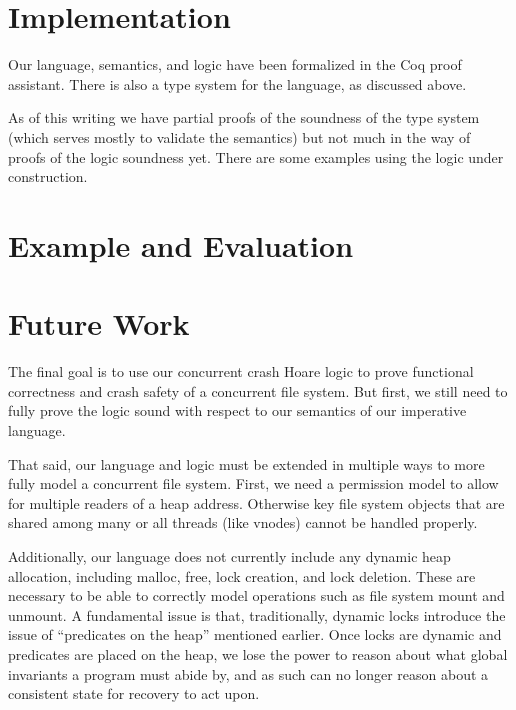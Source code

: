 \section{Implementation}
\label{sec:imp}

Our language, semantics, and logic have been formalized in the Coq
proof assistant.
There is also a type system for the language, as discussed above.

As of this writing we have partial proofs of the soundness of the type
system (which serves mostly to validate the semantics) but not much in
the way of proofs of the logic soundness yet.
There are some examples using the logic under construction.


\section{Example and Evaluation}
\label{sec:eval}



\section{Future Work}
\label{sec:future}


The final goal is to use our concurrent crash Hoare logic to prove
functional correctness and crash safety
of a concurrent file system.
But first,
we still need to fully prove the logic sound with respect to our
semantics of our imperative language.

That said, our language and logic must be extended in multiple ways to more
fully model a concurrent file system.
First, we need a
permission model to allow for multiple readers of a heap address.
Otherwise key file system objects that are shared among many or all
threads (like vnodes) cannot be handled properly.

Additionally, our language does not currently include any dynamic heap
allocation, including malloc, free, lock creation, and lock deletion.
These are
necessary to be able to correctly model operations such as file system mount and
unmount.
A fundamental issue is that, traditionally, dynamic locks introduce the
issue of ``predicates on the heap'' mentioned earlier.
Once locks are dynamic and
predicates are placed on the heap, we lose the power to reason about what global
invariants a program must abide by, and as such can no longer reason about a
consistent state for recovery to act upon.

